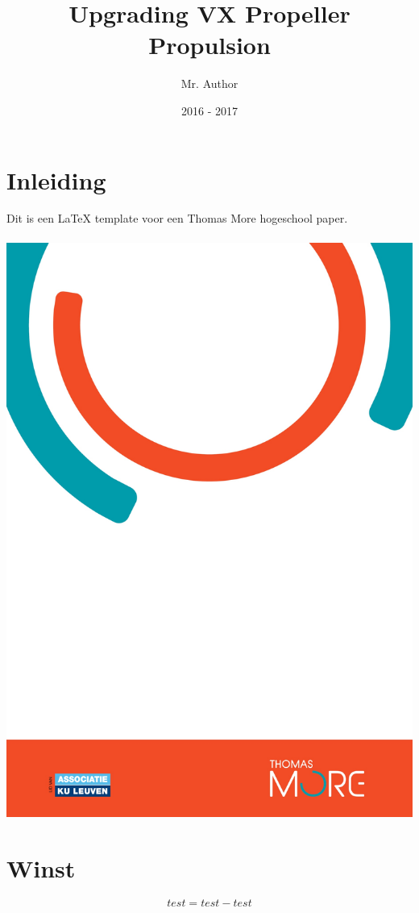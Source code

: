 \documentclass[11pt, a4paper, oneside]{article}
\title{Upgrading VX Propeller Propulsion}
\author{Mr. Author}
\date{2016 - 2017}
\begin{document}




\tableofcontents

\newpage



\chapter{Inleiding}

Dit is een LaTeX template voor een Thomas More hogeschool paper.\\\\
 \includegraphics[scale=0.5]{images/ThomasMoreBackground.jpeg}

\newpage

\chapter{Winst}

	\begin{mdframed}[backgroundcolor=grijs!40,shadow=false,roundcorner=8pt]
		$$test = test - test$$
	\end{mdframed}


\end{document}
